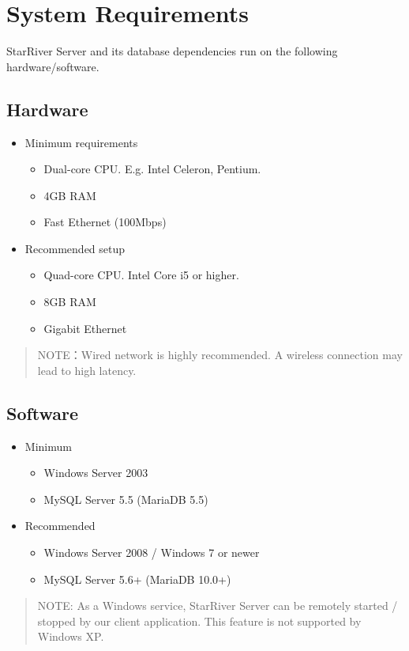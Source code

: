 \section{System Requirements}\label{system-requirements}

StarRiver Server and its database dependencies run on the following
hardware/software.

\subsection{Hardware}\label{hardware}

\begin{itemize}
\itemsep1pt\parskip0pt
\item
  Minimum requirements

  \begin{itemize}
  \itemsep1pt\parskip0pt
  \item
    Dual-core CPU. E.g. Intel Celeron, Pentium.
  \item
    4GB RAM
  \item
    Fast Ethernet (100Mbps)
  \end{itemize}
\item
  Recommended setup

  \begin{itemize}
  \itemsep1pt\parskip0pt
  \item
    Quad-core CPU. Intel Core i5 or higher.
  \item
    8GB RAM
  \item
    Gigabit Ethernet
  \end{itemize}
\end{itemize}

\begin{quote}
NOTE：Wired network is highly recommended. A wireless connection may
lead to high latency.
\end{quote}

\subsection{Software}\label{software}

\begin{itemize}
\itemsep1pt\parskip0pt
\item
  Minimum

  \begin{itemize}
  \itemsep1pt\parskip0pt
  \item
    Windows Server 2003
  \item
    MySQL Server 5.5 (MariaDB 5.5)
  \end{itemize}
\item
  Recommended

  \begin{itemize}
  \itemsep1pt\parskip0pt
  \item
    Windows Server 2008 / Windows 7 or newer
  \item
    MySQL Server 5.6+ (MariaDB 10.0+)
  \end{itemize}
\end{itemize}

\begin{quote}
NOTE: As a Windows service, StarRiver Server can be remotely started /
stopped by our client application. This feature is not supported by
Windows XP.
\end{quote}
